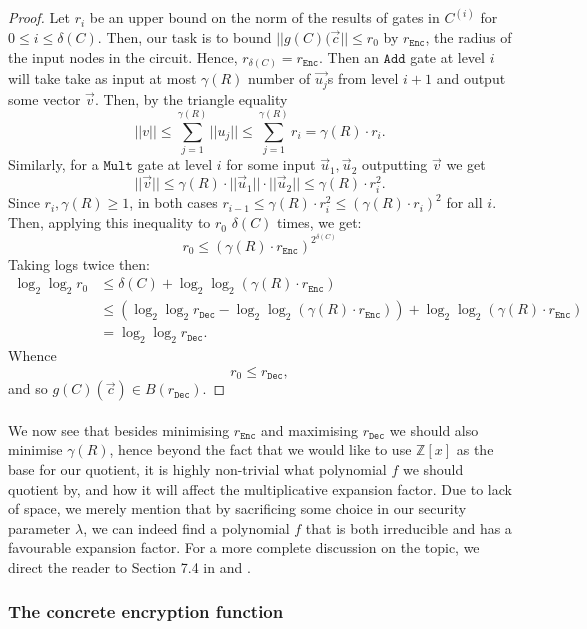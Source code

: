 \documentclass{article}
\theoremstyle{definition}
\theoremstyle{example}
\newcommand{\Enc}{\texttt{Enc}}
\newcommand{\Dec}{\texttt{Dec}}
\newcommand{\Int}{\mathbb{Z}}
\newcommand{\Add}{\texttt{Add}}
\newcommand{\Mult}{\texttt{Mult}}
\newcommand{\norm}[1]{||#1||}
\begin{document}
\begin{proof}
  Let $r_i$ be an upper bound on the norm of the results of gates in $C^{(i)}$
  for $0 \leq i \leq \delta(C)$. Then, our task is to bound $\norm{g(C)(\vec{c}}
  \leq r_0$ by $r_\Enc$, the radius of the input nodes in the circuit. Hence, $r_{\delta(C)} = r_\Enc$. Then
  an $\Add$ gate at level $i$ will take take as input at most $\gamma(R)$ number
  of $\vec{u_j}$s from level $i + 1$ and output some vector $\vec{v}$. Then, by
  the triangle equality
  \[
    \norm{v} \leq \sum_{j = 1}^{\gamma(R)}\norm{u_j} 
             \leq \sum_{j = 1}^{\gamma(R)} r_i
             = \gamma(R) \cdot r_i.
  \]
  Similarly, for a $\Mult$ gate at level $i$ for some input $\vec{u}_1,
  \vec{u}_2$ outputting $\vec{v}$ we get
  \[
    \norm{\vec{v}} \leq \gamma(R)\cdot\norm{\vec{u}_1}\cdot\norm{\vec{u}_2} \leq
    \gamma(R)\cdot r_i^2.
  \]
  Since $r_i, \gamma(R) \geq 1$, in both cases $r_{i-1} \leq \gamma(R)\cdot
  r_i^2 \leq (\gamma(R)\cdot r_i)^2$ for all $i$. Then, applying this inequality
  to $r_0$ $\delta(C)$ times, we get:
  \[
    r_0 \leq (\gamma(R)\cdot r_\Enc)^{2^{\delta(C)}}
  \]
  Taking logs twice then:
  \begin{align*}
    \log_2\log_2r_0 &\leq \delta(C) + \log_2\log_2(\gamma(R)\cdot r_\Enc)\\
                    &\leq (\log_2\log_2r_\Dec - \log_2\log_2(\gamma(R)\cdot r_\Enc)) + \log_2\log_2(\gamma(R)\cdot r_\Enc)\\
                    &= \log_2\log_2r_\Dec.
  \end{align*}
  Whence
  \[
    r_0 \leq r_\Dec,
  \]
  and so $g(C)(\vec{c}) \in B(r_\Dec)$.
\end{proof}
\paragraph{} We now see that besides minimising $r_\Enc$ and maximising $r_\Dec$
we should also minimise $\gamma(R)$, hence beyond the fact that we would like to
use $\Int[x]$ as the base for our quotient, it is highly non-trivial what
polynomial $f$ we should quotient by, and how it will affect the multiplicative
expansion factor. Due to lack of space, we merely mention that by sacrificing
some choice in our security parameter $\lambda$, we can indeed find a polynomial
$f$ that is both irreducible and has a favourable expansion factor. For a more complete
discussion on the topic, we direct the reader to Section 7.4 in
\cite{gentry2009fully} and \cite{lyubashevsky2006generalized}.
\subsubsection{The concrete encryption function}
\label{sec:enc_concretely}
\end{document}
